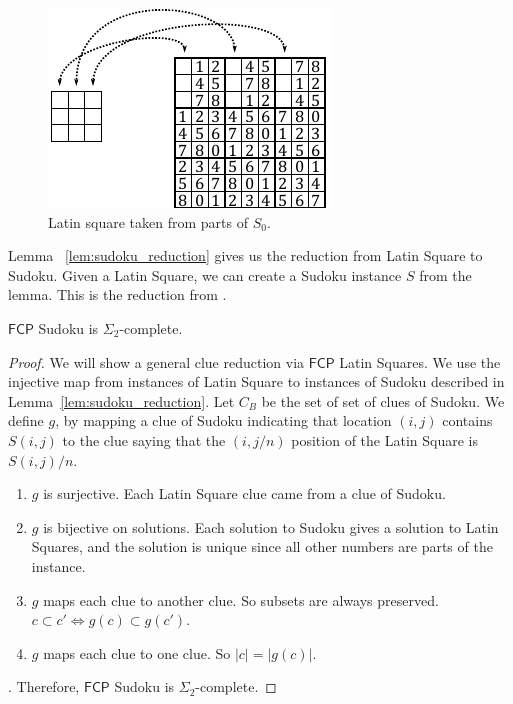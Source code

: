\documentclass[runningheads,a4paper]{llncs}
\begin{document}
\begin{figure}
\centering
\label{fig:latinsquare_to_sudoku}
\includegraphics[width=0.7\linewidth]{latinsquare_to_sudoku.pdf}
\caption{Latin square taken from parts of $S_0$.}
\end{figure}

Lemma ~\ref{lem:sudoku_reduction} gives us the reduction from Latin Square to Sudoku. Given a Latin Square, we can create a Sudoku instance $S$ from the lemma. This is the reduction from \cite{takayuki2003complexity}.

\begin{lemma} 
$\mathsf{FCP}$ Sudoku is $\Sigma_2$-complete.
\end{lemma}

\begin{proof} 
We will show a general clue reduction via $\mathsf{FCP}$ Latin Squares. We use the injective map from instances of Latin Square to instances of Sudoku described in Lemma~\ref{lem:sudoku_reduction}. Let $C_B$ be the set of set of clues of Sudoku. We define $g$, by mapping a clue of Sudoku indicating that location $(i,j)$ contains $S(i,j)$ to the clue saying that the $(i, j/n)$ position of the Latin Square is $S(i, j)/n$. 
\begin{enumerate}
\item $g$ is surjective. Each Latin Square clue came from a clue of Sudoku.
\item $g$ is bijective on solutions. Each solution to Sudoku gives a solution to Latin Squares, and the solution is unique since all other numbers are parts of the instance. 
\item $g$ maps each clue to another clue. So subsets are always preserved. $c \subset c' \iff g(c) \subset g(c')$. 
\item $g$ maps each clue to one clue. So $|c| = |g(c)|$. 
\end{enumerate}
. Therefore, $\mathsf{FCP}$ Sudoku is $\Sigma_2$-complete. 
\end{proof}
\end{document}

